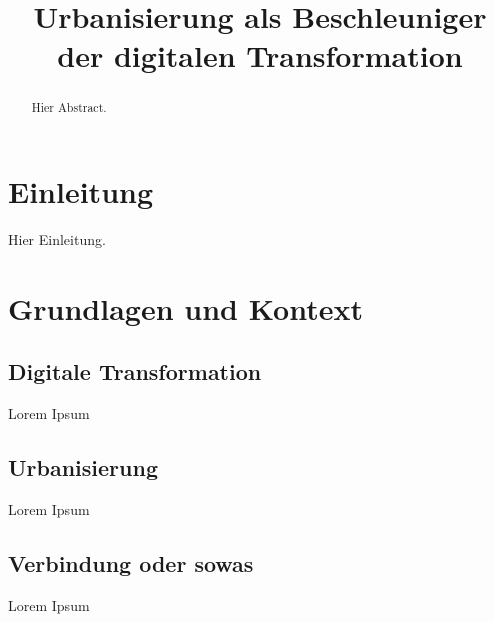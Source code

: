\documentclass[conference,compsoc,final,a4paper, onecolumn, 11pt]{IEEEtran}
\newcommand{\dokumententitel}[0]{Urbanisierung als Beschleuniger der digitalen Transformation}
\begin{document}
\title{\dokumententitel}

\author{
  \and
  \and
}

\maketitle
\thispagestyle{plain}
\pagestyle{plain}

\begin{abstract}
Hier Abstract.
\end{abstract}

{\tableofcontents}


\section{Einleitung}
Hier Einleitung.


\section{Grundlagen und Kontext}
\subsection{Digitale Transformation}
Lorem Ipsum

\subsection{Urbanisierung}
Lorem Ipsum

\subsection{Verbindung oder sowas}
Lorem Ipsum


\end{document}
